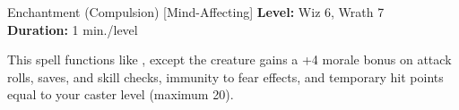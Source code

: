 {Enchantment (Compulsion) [Mind-Affecting]}
{
	\textbf{Level:}
	Wiz 6, Wrath 7\\
	\textbf{Duration:}
	1 min./level\\
}
{
	This spell functions like , except the creature gains a +4 morale bonus on attack rolls, saves, and skill checks, immunity to fear effects, and temporary hit points equal to your caster level (maximum 20).

}
